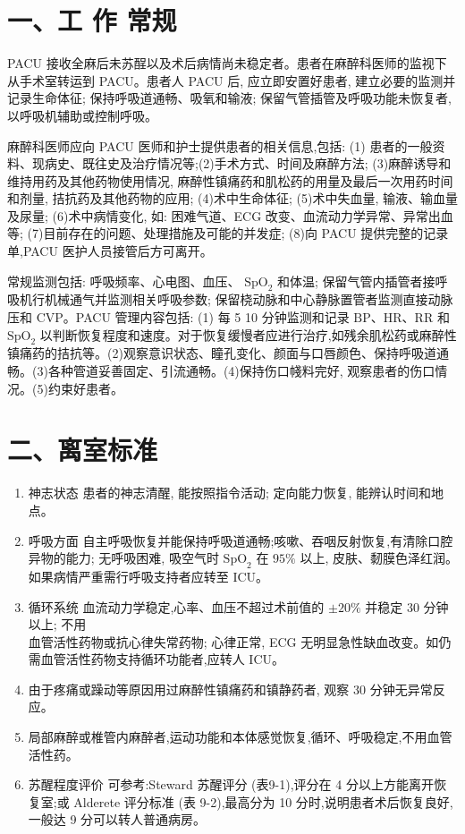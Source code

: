 \documentclass[10pt]{article}
\begin{document}
\section*{一、工 作 常规}
PACU 接收全麻后未苏酲以及术后病情尚未稳定者。患者在麻醉科医师的监视下从手术室转运到 PACU。患者人 PACU 后, 应立即安置好患者, 建立必要的监测并记录生命体征; 保持呼吸道通畅、吸氧和输液; 保留气管插管及呼吸功能未恢复者, 以呼吸机辅助或控制呼吸。

麻醉科医师应向 PACU 医师和护士提供患者的相关信息,包括: (1) 患者的一般资料、现病史、既往史及治疗情况等;(2)手术方式、时间及麻醉方法; (3)麻醉诱导和维持用药及其他药物使用情况, 麻醉性镇痛药和肌松药的用量及最后一次用药时间和剂量, 拮抗药及其他药物的应用; (4)术中生命体征; (5)术中失血量, 输液、输血量及尿量; (6)术中病情变化, 如: 困难气道、ECG 改变、血流动力学异常、异常出血等; (7)目前存在的问题、处理措施及可能的并发症; (8)向 PACU 提供完整的记录单,PACU 医护人员接管后方可离开。

常规监测包括: 呼吸频率、心电图、血压、 $\mathrm{SpO}_{2}$ 和体温; 保留气管内插管者接呼吸机行机械通气并监测相关呼吸参数; 保留桡动脉和中心静脉置管者监测直接动脉压和 CVP。PACU 管理内容包括: (1) 每 5 10 分钟监测和记录 $\mathrm{BP} 、 \mathrm{HR} 、 \mathrm{RR}$ 和 $\mathrm{SpO}_{2}$ 以判断恢复程度和速度。对于恢复缓慢者应进行治疗,如残余肌松药或麻醉性镇痛药的拮抗等。(2)观察意识状态、瞳孔变化、颜面与口唇颜色、保持呼吸道通畅。(3)各种管道妥善固定、引流通畅。(4)保持伤口帴料完好, 观察患者的伤口情况。(5)约束好患者。

\section*{二、离室标准}
\begin{enumerate}
  \item 神志状态 患者的神志清醒, 能按照指令活动; 定向能力恢复, 能辨认时间和地点。

  \item 呼吸方面 自主呼吸恢复并能保持呼吸道通畅;咳嗽、吞咽反射恢复,有清除口腔异物的能力; 无呼吸困难, 吸空气时 $\mathrm{SpO}_{2}$ 在 $95 \%$ 以上, 皮肤、䵑膜色泽红润。如果病情严重需行呼吸支持者应转至 ICU。

  \item 循环系统 血流动力学稳定,心率、血压不超过术前值的 $\pm 20 \%$ 并稳定 30 分钟以上; 不用\\
血管活性药物或抗心律失常药物; 心律正常, ECG 无明显急性缺血改变。如仍需血管活性药物支持循环功能者,应转人 ICU。

  \item 由于疼痛或躁动等原因用过麻醉性镇痛药和镇静药者, 观察 30 分钟无异常反应。

  \item 局部麻醉或椎管内麻醉者,运动功能和本体感觉恢复,循环、呼吸稳定,不用血管活性药。

  \item 苏醒程度评价 可参考:Steward 苏醒评分 (表9-1),评分在 4 分以上方能离开恢复室;或 Alderete 评分标准 (表 9-2),最高分为 10 分时,说明患者术后恢复良好,一般达 9 分可以转人普通病房。

\end{enumerate}
\end{document}
